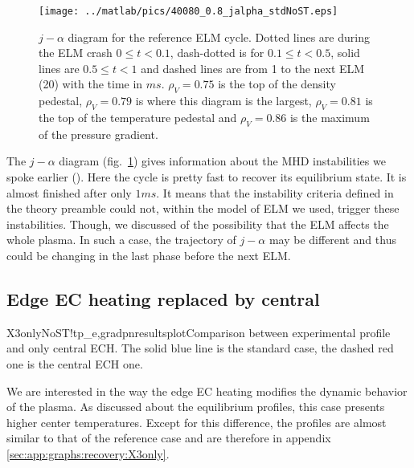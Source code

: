 \begin{figure}[!t]
\begin{center}
\texttt{[image: ../matlab/pics/40080\_0.8\_jalpha\_stdNoST.eps]}
\vspace{-0.5cm}
\end{center}
\caption{\footnotesize $j - \alpha$ diagram for the reference ELM cycle. Dotted lines are during the ELM crash $0 \le t <0.1$, dash-dotted is for $0.1 \le t < 0.5$, solid lines are $0.5 \le t < 1$ and dashed lines are from 1 to the next ELM (20) with the time in $ms$. $\rho_V = 0.75$ is the top of the density pedestal, $\rho_V = 0.79$ is where this diagram is the largest, $\rho_V = 0.81$ is the top of the temperature pedestal and $\rho_V = 0.86$ is the maximum of the pressure gradient.\label{fig:results:ELM:std:jalpha}}
\vspace{-0.5cm}
\end{figure}
The $j - \alpha$ diagram (fig.~\ref{fig:results:ELM:std:jalpha}) gives information about the MHD instabilities we spoke earlier (). Here the cycle is pretty fast to recover its equilibrium state. It is almost finished after only $1ms$. It means that the instability criteria defined in the theory preamble could not, within the model of ELM we used, trigger these instabilities. Though, we discussed of the possibility that the ELM affects the whole plasma. In such a case, the trajectory of $j - \alpha$ may be different and thus could be changing in the last phase before the next ELM.
\newpage
\subsection{Edge EC heating replaced by central}\label{sec:results:ELMs:recover:X3only}
\begin{AllFigs}{X3onlyNoST}{!t}{}{p_e,gradp}{n}{resultsplot}{Comparison between experimental profile and only central ECH. The solid blue line is the standard case, the dashed red one is the central ECH one.}
\end{AllFigs}

We are interested in the way the edge EC heating modifies the dynamic behavior of the plasma. As discussed about the equilibrium profiles, this case presents higher center temperatures. Except for this difference, the profiles are almost similar to that of the reference case and are therefore in appendix \ref{sec:app:graphs:recovery:X3only}.

